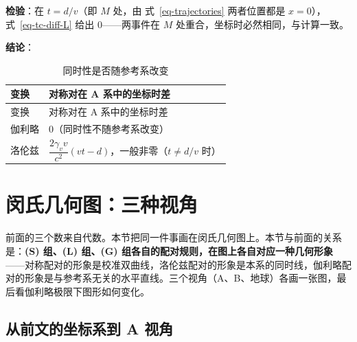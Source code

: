 \documentclass[
  chinese,
  a4paper,
  UTF8,
  12pt,
  oneside,
  openany]{ctexbook}
\theoremstyle{plain}
\theoremstyle{plain}
\theoremstyle{plain}
\theoremstyle{definition}
\theoremstyle{plain}
\theoremstyle{plain}
\theoremstyle{remark}
\begin{document}
\textbf{检验}：在 \(t=d/v\)（即 \(M\) 处，由 式~\ref{eq-trajectories}
两者位置都是 \(x=0\)），式~\ref{eq-tc-diff-L} 给出 \(0\)------两事件在
\(M\) 处重合，坐标时必然相同，与计算一致。

\textbf{结论}：

\begin{longtable}[]{@{}
  >{\raggedright\arraybackslash}p{}
  >{\raggedright\arraybackslash}p{}@{}}
\caption{同时性是否随参考系改变}\label{tbl-tc-simultaneity}\tabularnewline
\toprule\noalign{}
\begin{minipage}[b]{\linewidth}\raggedright
变换
\end{minipage} & \begin{minipage}[b]{\linewidth}\raggedright
对称对在 A 系中的坐标时差
\end{minipage} \\
\midrule\noalign{}
\endfirsthead
\toprule\noalign{}
\begin{minipage}[b]{\linewidth}\raggedright
变换
\end{minipage} & \begin{minipage}[b]{\linewidth}\raggedright
对称对在 A 系中的坐标时差
\end{minipage} \\
\midrule\noalign{}
\endhead
\bottomrule\noalign{}
\endlastfoot
伽利略 & \(0\)（同时性不随参考系改变） \\
洛伦兹 & \(\dfrac{2\gamma_v v}{c^{2}}(vt-d)\)，一般非零（\(t\neq d/v\)
时） \\
\end{longtable}

\section{闵氏几何图：三种视角}\label{sec-tc-geometry}

前面的三个数来自代数。本节把同一件事画在闵氏几何图上。本节与前面的关系是：\textbf{(S)
组、(L) 组、(G)
组各自的配对规则，在图上各自对应一种几何形象}------对称配对的形象是校准双曲线，洛伦兹配对的形象是本系的同时线，伽利略配对的形象是与参考系无关的水平直线。三个视角（A、B、地球）各画一张图，最后看伽利略极限下图形如何变化。

\subsection{从前文的坐标系到 A
视角}\label{ux4eceux524dux6587ux7684ux5750ux6807ux7cfbux5230-a-ux89c6ux89d2}
\end{document}
